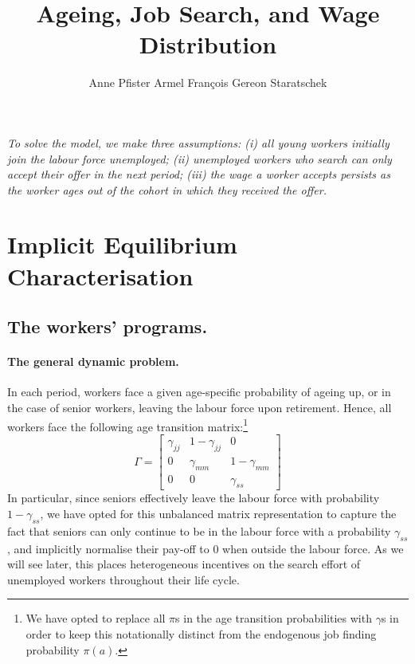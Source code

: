 \documentclass{article}
\begin{document}
\begin{titlepage}
\title{Ageing, Job Search, and Wage Distribution}

\author{Anne Pfister \quad Armel François \quad Gereon Staratschek}

\maketitle


\tableofcontents
\par\medskip
\end{titlepage}

\textit{To solve the model, we make three assumptions: (i) all young workers initially join the labour force unemployed; (ii) unemployed workers who search can only accept their offer in the next period; (iii) the wage a worker accepts persists as the worker ages out of the cohort in which they received the offer.}
\par\medskip
\section{Implicit Equilibrium Characterisation}
\smallskip

\subsection{The workers' programs.}

\paragraph{The general dynamic problem.}
In each period, workers face a given age-specific probability of ageing up, or in the case of senior workers, leaving the labour force upon retirement. Hence, all workers face the following age transition matrix:\footnote{We have opted to replace all $\pi$s in the age transition probabilities with $\gamma$s in order to keep this notationally distinct from the endogenous job finding probability $\pi(a)$.}
\[
\Gamma = \begin{bmatrix}
    \gamma_{jj} & 1-\gamma_{jj} & 0 \\
    0 & \gamma_{mm} & 1-\gamma_{mm} \\
    0 & 0 & \gamma_{ss}
\end{bmatrix}
\]
In particular, since seniors effectively leave the labour force with probability $1-\gamma_{ss}$, we have opted for this unbalanced matrix representation to capture the fact that seniors can only continue to be in the labour force with a probability $\gamma_{ss}$, and implicitly normalise their pay-off to $0$ when outside the labour force. As we will see later, this places heterogeneous incentives on the search effort of unemployed workers throughout their life cycle.
\end{document}
